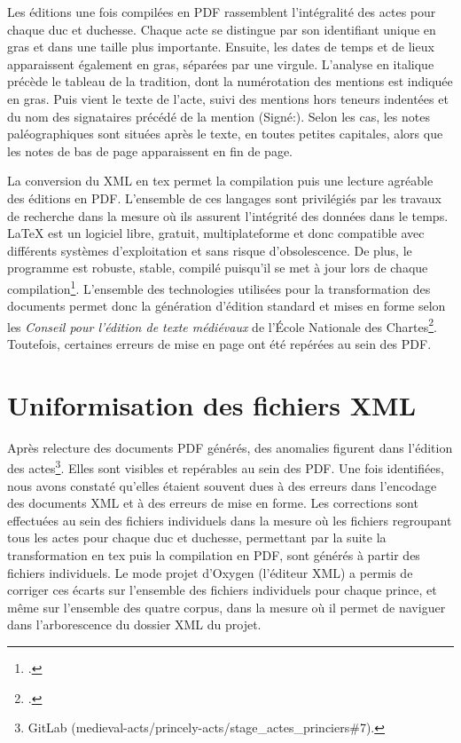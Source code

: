 \par Les éditions une fois compilées en PDF rassemblent l'intégralité des actes pour chaque duc et duchesse. Chaque acte se distingue par son identifiant unique en gras et dans une taille plus importante. Ensuite, les dates de temps et de lieux apparaissent également en gras, séparées par une virgule. L'analyse en italique précède le tableau de la tradition, dont la numérotation des mentions est indiquée en gras. Puis vient le texte de l'acte, suivi des mentions hors teneurs indentées et du nom des signataires précédé de la mention \og (Signé:)\fg. Selon les cas, les notes paléographiques sont situées après le texte, en toutes petites capitales, alors que les notes de bas de page apparaissent en fin de page.  

\par La conversion du XML en tex permet la compilation puis une lecture agréable des éditions en PDF. L'ensemble de ces langages sont privilégiés par les travaux de recherche dans la mesure où ils assurent l'intégrité des données dans le temps. LaTeX est un logiciel libre, gratuit, multiplateforme et donc compatible avec différents systèmes d'exploitation et sans risque d'obsolescence. De plus, le programme est robuste, stable, compilé puisqu'il se met à jour lors de chaque compilation\footnote{\cite{LaTeX}.}. L'ensemble des technologies utilisées pour la transformation des documents permet donc la génération d'édition standard et mises en forme selon les \textit{Conseil pour l'édition de texte médiévaux} de l'École Nationale des Chartes\footnote{\cite{guyotjeanninConseilsPourEdition2009} \newline \cite{guyotjeanninConseilsPourEdition2014}.}. Toutefois, certaines erreurs de mise en page ont été repérées au sein des PDF. 
\newpage 

\section{Uniformisation des fichiers XML}

\par Après relecture des documents PDF générés, des anomalies figurent dans l'édition des actes\footnote{GitLab (medieval-acts/princely-acts/stage\_actes\_princiers\#7).}. Elles sont visibles et repérables au sein des PDF. Une fois identifiées, nous avons constaté qu'elles étaient souvent dues à des erreurs dans l'encodage des documents XML et à des erreurs de mise en forme. Les corrections sont effectuées au sein des fichiers individuels dans la mesure où les fichiers regroupant tous les actes pour chaque duc et duchesse, permettant par la suite la transformation en tex puis la compilation en PDF, sont générés à partir des fichiers individuels. Le mode projet d'Oxygen (l'éditeur XML) a permis de corriger ces écarts sur l'ensemble des fichiers individuels pour chaque prince, et même sur l'ensemble des quatre corpus, dans la mesure où il permet de naviguer dans l'arborescence du dossier XML du projet. 
\newline 

